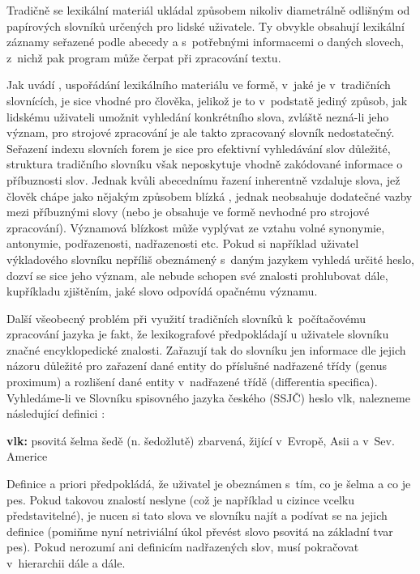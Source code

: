 \documentclass[a4paper,11pt,openany,twoside]{book}
\newcommand\ex{\textsf}
\begin{document}
				Tradičně se lexikální materiál ukládal způsobem nikoliv diametrálně odlišným od papírových slovníků určených pro lidské uživatele. Ty obvykle obsahují lexikální záznamy seřazené podle abecedy a s~potřebnými informacemi o daných slovech, z~nichž pak program může čerpat při zpracování textu.

				Jak uvádí \textcite{pala2013vceska}, uspořádání lexikálního materiálu ve formě, v~jaké je v~tradičních slovnících, je sice vhodné pro člověka, jelikož je to v~podstatě jediný způsob, jak lidskému uživateli umožnit vyhledání konkrétního slova, zvláště nezná-li jeho význam, pro strojové zpracování je ale takto zpracovaný slovník nedostatečný. Seřazení indexu slovních forem je sice pro efektivní vyhledávání slov důležité, struktura tradičního slovníku však neposkytuje vhodně zakódované informace o příbuznosti slov. Jednak kvůli abecednímu řazení inherentně vzdaluje slova, jež člověk chápe jako nějakým způsobem blízká \parencite{pala2013vceska}, jednak neobsahuje dodatečné vazby mezi příbuznými slovy (nebo je obsahuje ve formě nevhodné pro strojové zpracování). Významová blízkost může vyplývat ze vztahu volné synonymie, antonymie, podřazenosti, nadřazenosti etc. Pokud si například uživatel výkladového slovníku nepříliš obeznámený s~daným jazykem vyhledá určité heslo, dozví se sice jeho význam, ale nebude schopen své znalosti prohlubovat dále, kupříkladu zjištěním, jaké slovo odpovídá opačnému významu.

				Další všeobecný problém při využití tradičních slovníků k~počítačovému zpracování jazyka je fakt, že lexikografové předpokládají u uživatele slovníku značné encyklopedické znalosti. Zařazují tak do slovníku jen informace dle jejich názoru důležité pro zařazení dané entity do příslušné nadřazené třídy (genus proximum) a rozlišení dané entity v~nadřazené třídě (differentia specifica). Vyhledáme-li ve Slovníku spisovného jazyka českého (SSJČ) heslo \ex{vlk}, nalezneme následující definici \parencite{Havranek1989}:

				\bigskip
				{\noindent \ex{\textbf{vlk: } psovitá šelma šedě (n. šedožlutě) zbarvená, žijící v~Evropě, Asii a v~Sev. Americe}}
				\bigskip

				Definice a priori předpokládá, že uživatel je obeznámen s~tím, co je \ex{šelma} a co je \ex{pes}. Pokud takovou znalostí neslyne (což je například u cizince vcelku představitelné), je nucen si tato slova ve slovníku najít a podívat se na jejich definice (pomiňme nyní netriviální úkol převést slovo \ex{psovitá} na základní tvar \ex{pes}). Pokud nerozumí ani definicím nadřazených slov, musí pokračovat v~hierarchii dále a dále. 
\end{document}
